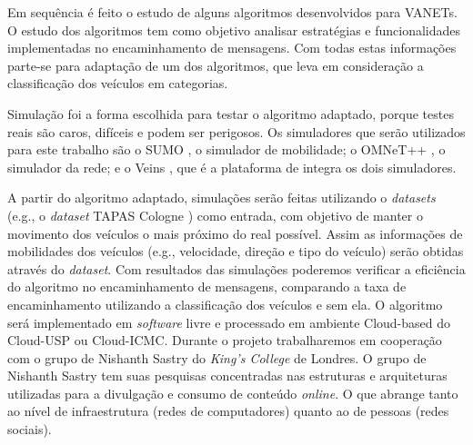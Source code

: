 \documentclass[mestrado, pre-defesa, english, brazil]{packages/icmc}
\begin{document}
Em sequência é feito o estudo de alguns algoritmos desenvolvidos para VANETs. O estudo dos algoritmos tem como objetivo analisar estratégias e funcionalidades implementadas no encaminhamento de mensagens. Com todas estas informações parte-se para adaptação de um dos algoritmos, que leva em consideração a classificação dos veículos em categorias.

Simulação foi a forma escolhida para testar o algoritmo adaptado, porque testes reais são caros, difíceis e podem ser perigosos. Os simuladores que serão utilizados para este trabalho são o SUMO \cite{Sumo-2014}, o simulador de mobilidade; o OMNeT++ \cite{OMNeT++-2014}, o simulador da rede; e o Veins \cite{Veins-2014}, que é a plataforma de integra os dois simuladores.

A partir do algoritmo adaptado, simulações serão feitas utilizando o \textit{datasets} (e.g., o \textit{dataset} TAPAS Cologne \cite{tapas-2014}) como entrada, com objetivo de manter o movimento dos veículos o mais próximo do real possível. Assim as informações de mobilidades dos veículos (e.g., velocidade, direção e tipo do veículo) serão obtidas através do \textit{dataset}. Com resultados das simulações poderemos verificar a eficiência do algoritmo no encaminhamento de mensagens, comparando a taxa de encaminhamento utilizando a classificação dos veículos e sem ela. O algoritmo será implementado em \textit{software} livre e processado em ambiente Cloud-based do Cloud-USP ou Cloud-ICMC. Durante o projeto trabalharemos em cooperação com o grupo de Nishanth Sastry do \emph{King's College} de Londres. O grupo de Nishanth Sastry tem suas pesquisas concentradas nas estruturas e arquiteturas utilizadas para a divulgação e consumo de conteúdo \textit{online}. O que abrange tanto ao nível de infraestrutura (redes de computadores) quanto ao de pessoas (redes sociais).

\end{document}
